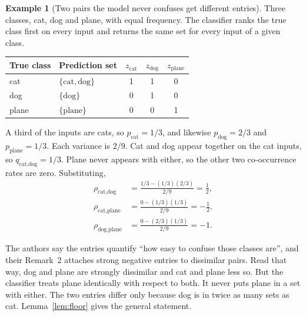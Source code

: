 \documentclass[11pt]{article}
\theoremstyle{definition}
\newtheorem{example}{Example}
\theoremstyle{definition}
\theoremstyle{remark}
\newcommand{\set}[1]{\{#1\}}
\begin{document}
\begin{example}[Two pairs the model never confuses get different entries]\label{ex:rates}
Three classes, cat, dog and plane, with equal frequency. The classifier ranks the true class first
on every input and returns the same set for every input of a given class.

\begin{center}
\begin{tabular}{llccc}
\toprule
True class & Prediction set & $z_{\text{cat}}$ & $z_{\text{dog}}$ & $z_{\text{plane}}$ \\
\midrule
cat   & $\set{\text{cat}, \text{dog}}$ & 1 & 1 & 0 \\
dog   & $\set{\text{dog}}$             & 0 & 1 & 0 \\
plane & $\set{\text{plane}}$           & 0 & 0 & 1 \\
\bottomrule
\end{tabular}
\end{center}

A third of the inputs are cats, so $p_{\text{cat}} = 1/3$, and likewise $p_{\text{dog}} = 2/3$ and
$p_{\text{plane}} = 1/3$. Each variance is $2/9$. Cat and dog appear together on the cat inputs, so
$q_{\text{cat},\text{dog}} = 1/3$. Plane never appears with either, so the other two co-occurrence
rates are zero. Substituting,
\begin{align*}
\rho_{\text{cat},\text{dog}} &= \frac{1/3 - (1/3)(2/3)}{2/9} = \tfrac12, \\
\rho_{\text{cat},\text{plane}} &= \frac{0 - (1/3)(1/3)}{2/9} = -\tfrac12, \\
\rho_{\text{dog},\text{plane}} &= \frac{0 - (2/3)(1/3)}{2/9} = -1 .
\end{align*}

The authors say the entries quantify ``how easy to confuse those classes are'', and their Remark~2
attaches strong negative entries to dissimilar pairs. Read that way, dog and plane are strongly
dissimilar and cat and plane less so. But the classifier treats plane identically with respect to both. It never puts plane
in a set with either. The two entries differ only because dog is in twice as many sets as cat.
Lemma~\ref{lem:floor} gives the general statement.
\end{example}
\end{document}
